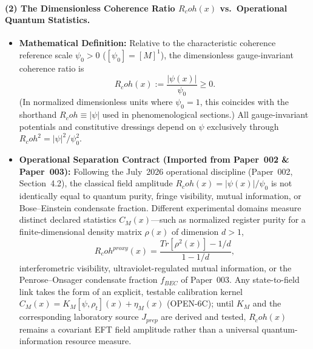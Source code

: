 \documentclass[american,11pt,letterpaper]{article}
\newcommand{\Rcoh}{R_{\mathrm{coh}}}
\def\mathrm#1{#1}%
\def\texttt#1{#1}%
\def\emph#1{#1}%
\def\Rcoh{R_coh}%
\begin{document}
\paragraph{(2) The Dimensionless Coherence Ratio $\Rcoh(x)$ vs.\ Operational Quantum Statistics.}
\begin{itemize}
  \item \textbf{Mathematical Definition:} Relative to the characteristic coherence reference scale $\psi_0 > 0$ ($[\psi_0] = [M]^1$), the dimensionless gauge-invariant coherence ratio is
  \begin{equation}
  \Rcoh(x) := \frac{|\psi(x)|}{\psi_0} \ge 0.
  \label{eq:def_Rcoh_canonical}
  \end{equation}
  (In normalized dimensionless units where $\psi_0 = 1$, this coincides with the shorthand $\Rcoh \equiv |\psi|$ used in phenomenological sections.) All gauge-invariant potentials and constitutive dressings depend on $\psi$ exclusively through $\Rcoh^2 = |\psi|^2/\psi_0^2$.
  \item \textbf{Operational Separation Contract (Imported from Paper~002 \& Paper~003):} Following the July~2026 operational discipline (Paper~002, Section~4.2), the classical field amplitude $\Rcoh(x) = |\psi(x)|/\psi_0$ is \emph{not} identically equal to quantum purity, fringe visibility, mutual information, or Bose--Einstein condensate fraction. Different experimental domains measure distinct declared statistics $C_M(x)$---such as normalized register purity for a finite-dimensional density matrix $\rho(x)$ of dimension $d > 1$,
  \begin{equation}
  \Rcoh^{\mathrm{proxy}}(x) = \frac{\mathrm{Tr}[\rho^2(x)] - 1/d}{1 - 1/d},
  \label{eq:purity_proxy_def}
  \end{equation}
  interferometric visibility, ultraviolet-regulated mutual information, or the Penrose--Onsager condensate fraction $f_{\mathrm{BEC}}$ of Paper~003. Any state-to-field link takes the form of an explicit, testable calibration kernel $C_M(x) = K_M[\psi,\rho_t](x) + \eta_M(x)$ (\texttt{OPEN-6C}); until $K_M$ and the corresponding laboratory source $J_{\mathrm{prep}}$ are derived and tested, $\Rcoh(x)$ remains a covariant EFT field amplitude rather than a universal quantum-information resource measure.
\end{itemize}
\end{document}
